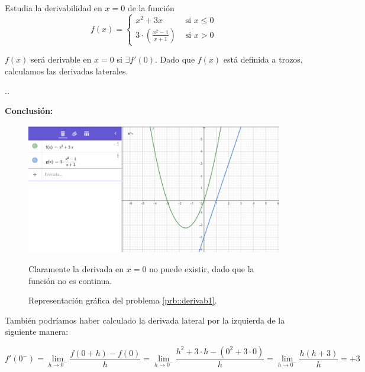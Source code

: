 \begin{problem} Estudia la derivabilidad en $x=0$ de la función 
\label{prb::derivab1}
\[f(x) = \begin{cases} x^2+3x & \text{ si } x\leq 0\\ 3·\left(\frac{x^2-1}{x+1}\right)&\text{ si } x>0\end{cases}\]
\solution

$f(x)$ será derivable en $x=0$ si $\exists f'(0)$. Dado que $f(x)$ está definida a trozos, calculamos las derivadas laterales.

.\vspace{4cm}.

\textbf{Conclusión:} %

\begin{figure}[pb!]
\centering
\includegraphics[scale=0.5]{img/DerivabilidadEjer1}
\label{fig::DerivabEjer1}
\caption{Representación gráfica del problema \ref{prb::derivab1}.}
Claramente la derivada en $x=0$ no puede existir, dado que la función no es continua.
\end{figure}

\obs También podríamos haber calculado la derivada lateral por la izquierda de la siguiente manera:

\[f'(0^-) = \lim_{h\to 0^-} \frac{f(0+h)-f(0)}{h} = \lim_{h\to 0^-} \frac{h^2+3·h-(0^2+3·0)}{h} = \lim_{h\to 0^-} \frac{h(h+3)}{h} = +3\]

\end{problem}

